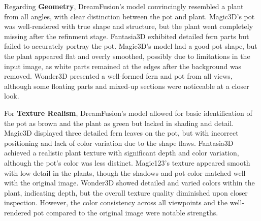 Regarding \textbf{Geometry}, DreamFusion's model convincingly resembled a plant from all angles, with clear distinction between the pot and plant. Magic3D's pot was well-rendered with true shape and structure, but the plant went completely missing after the refinment stage. Fantasia3D exhibited detailed fern parts but failed to accurately portray the pot. Magic3D's model had a good pot shape, but the plant appeared flat and overly smoothed, possibly due to limitations in the input image, as white parts remained at the edges after the background was removed. Wonder3D presented a well-formed fern and pot from all views, although some floating parts and mixed-up sections were noticeable at a closer look.

For \textbf{Texture Realism}, DreamFusion's model allowed for basic identification of the pot as brown and the plant as green but lacked in shading and detail. Magic3D displayed three detailed fern leaves on the pot, but with incorrect positioning and lack of color variation due to the shape flaws. Fantasia3D achieved a realistic plant texture with significant depth and color variation, although the pot's color was less distinct. Magic123's texture appeared smooth with low detail in the plants, though the shadows and pot color matched well with the original image. Wonder3D showed detailed and varied colors within the plant, indicating depth, but the overall texture quality diminished upon closer inspection. However, the color consistency across all viewpoints and the well-rendered pot compared to the original image were notable strengths.

